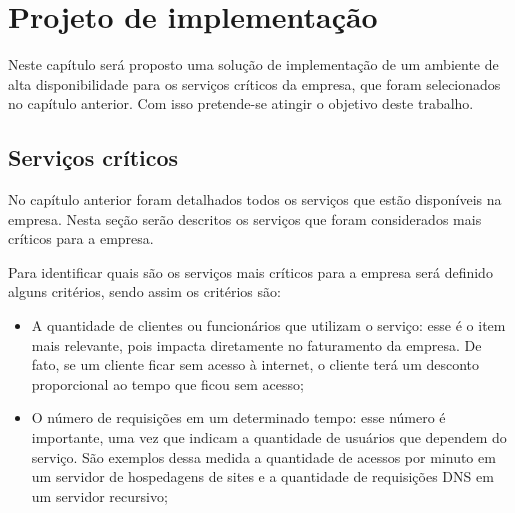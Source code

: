 \chapter{Projeto de implementação}
\label{cap:projetoimplementacao}

Neste capítulo será proposto uma solução de implementação de um ambiente de alta disponibilidade para os serviços críticos da empresa, que 
foram selecionados no capítulo anterior. Com isso pretende-se atingir o objetivo deste trabalho.

\section{Serviços críticos}
\label{section:servcrit}

No capítulo anterior foram detalhados todos os serviços que estão disponíveis na empresa. Nesta seção serão descritos os serviços que foram 
considerados mais críticos para a empresa. 

Para identificar quais são os serviços mais críticos para a empresa será definido alguns critérios, sendo assim os critérios são: 
\begin{itemize}
 \item A quantidade de clientes ou funcionários que utilizam o serviço: esse é o item mais relevante, pois impacta diretamente no faturamento
 da empresa. De fato, se um cliente ficar sem acesso à internet, o cliente terá um desconto proporcional ao tempo que ficou sem acesso; 
 \item O número de requisições em um determinado tempo: esse número é importante, uma vez que indicam a quantidade de usuários que dependem do 
 serviço. São exemplos dessa medida a quantidade de acessos por minuto em um servidor de hospedagens de sites e a quantidade de requisições 
 \ac{DNS} em um servidor recursivo;
\end{itemize}

